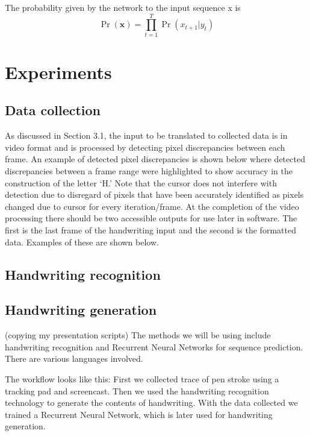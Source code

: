 \documentclass{article} %
\begin{document}
The probability given by the network to the input sequence x is
\begin{equation}
\Pr(\mathbf{x}) = \prod_{t=1}^T{\Pr(x_{t+1}|y_t)}
\end{equation}



\section{Experiments}
\subsection{Data collection}

As discussed in Section 3.1, the input to be translated to collected data is in video format and is processed by detecting pixel discrepancies between each frame. An example of detected pixel discrepancies is shown below where detected discrepancies between a frame range were highlighted to show accuracy in the construction of the letter ‘H.’ Note that the cursor does not interfere with detection due to disregard of pixels that have been accurately identified as pixels changed due to cursor for every iteration/frame.
At the completion of the video processing there should be two accessible outputs for use later in software. The first is the last frame of the handwriting input and the second is the formatted data. Examples of these are shown below.

\subsection{Handwriting recognition}
\subsection{Handwriting generation}
(copying my presentation scripts)
The methods we will be using include handwriting recognition and Recurrent Neural Networks for sequence prediction. There are various languages involved. 



The workflow looks like this: 
First we collected trace of pen stroke using a tracking pad and screencast. Then we used the handwriting recognition technology to generate the contents of handwriting. With the data collected we trained a Recurrent Neural Network, which is later used for handwriting generation. 
\end{document}
